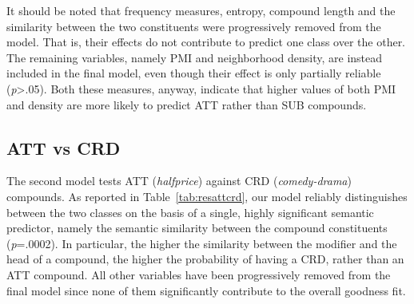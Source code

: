 \documentclass[output=paper]{langsci/langscibook}
\begin{document}
It should be noted that frequency measures, entropy, compound length and the similarity between the two constituents were progressively removed from the model. That is, their effects do not contribute to predict one class over the other. The remaining variables, namely PMI and neighborhood density, are instead included in the final model, even though their effect is only partially reliable (\emph{p}>.05). Both these measures, anyway, indicate that higher values of both PMI and density are more likely to predict ATT rather than SUB compounds.



\subsection{ATT vs CRD}

The second model tests ATT (\emph{halfprice}) against CRD (\emph{comedy-drama}) compounds. As reported in Table~\ref{tab:resattcrd}, our model reliably distinguishes between the two classes on the basis of a single, highly significant semantic predictor, namely the semantic similarity between the compound constituents (\emph{p}=.0002). In particular, the higher the similarity between the modifier and the head of a compound, the higher the probability of having a CRD, rather than an ATT compound. All other variables have been progressively removed from the final model since none of them significantly contribute to the overall goodness fit.
\end{document}
